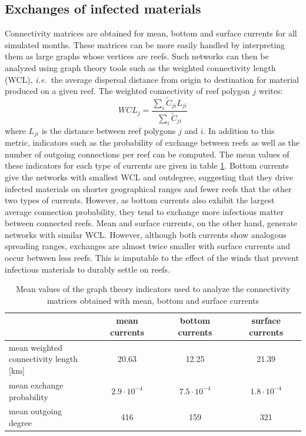 \documentclass[utf8]{frontiersSCNS}
\newcommand{\ie}{{\it i.e.}\ }
\begin{document}
\subsection{Exchanges of infected materials}
Connectivity matrices are obtained for mean, bottom and surface currents for all simulated months. These matrices can be more easily handled by interpreting them as large graphs whose vertices are reefs. Such networks can then be analyzed using graph theory tools such as the weighted connectivity length (WCL), \ie the average dispersal distance from origin to destination for material produced on a given reef. The weighted connectivity of reef polygon $j$ writes:
\begin{equation}
    WCL_j = \dfrac{\sum_i \tilde{C}_{ji} L_{ji}}{\sum_i \tilde{C}_{ji}}
\end{equation}
where $L_{ji}$ is the distance between reef polygons $j$ and $i$. In addition to this metric, indicators such as the probability of exchange between reefs as well as the number of outgoing connections per reef can be computed. The mean values of these indicators for each type of currents are given in table \ref{tab:connect}. Bottom currents give the networks with smallest WCL and outdegree, suggesting that they drive infected materials on shorter geographical ranges and fewer reefs that the other two types of currents. However, as bottom currents also exhibit the largest average connection probability, they tend to exchange more infectious matter between connected reefs. Mean and surface currents, on the other hand, generate networks with similar WCL. However, although both currents show analogous spreading ranges, exchanges are almost twice smaller with surface currents and occur between less reefs.  This is imputable to the effect of the winds that prevent infectious materials to durably settle on reefs.

\begin{table}
    \centering
    \begin{tabular}{|l|c|c|c|}
        \hline
                                   & mean currents      & bottom currents    & surface currents   \\
        \hline
        \makecell{mean weighted \\
        connectivity length [km]}  & 20.63              & 12.25              & 21.39              \\
        \hline
        \makecell{mean exchange 
        \\probability}             & $2.9\cdot 10^{-4}$ & $7.5\cdot 10^{-4}$ & $1.8\cdot 10^{-4}$ \\
        \hline
        \makecell{mean outgoing \\
        degree}                    & 416                & 159                & 321 \\
        \hline
    \end{tabular}
    \caption{Mean values of the graph theory indicators used to analyze the connectivity matrices obtained with mean, bottom and surface currents}
    \label{tab:connect}
\end{table}
\end{document}
